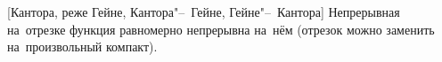 [Кантора, реже Гейне, Кантора"--~Гейне, Гейне"--~Кантора]\label{kg}
Непрерывная на~отрезке функция равномерно непрерывна на~нём (отрезок можно заменить на~произвольный компакт).
